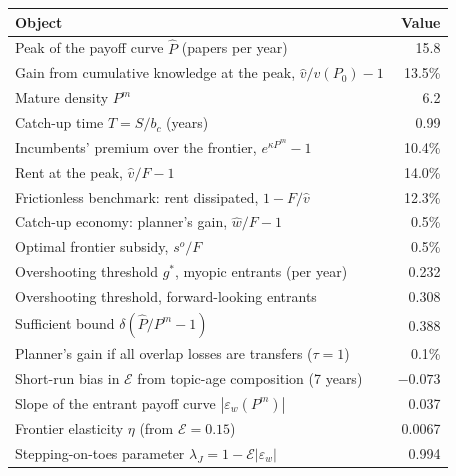 \begin{tabular}{@{}lr@{}}
\toprule
Object & Value \\
\midrule
Peak of the payoff curve $\hat P$ (papers per year) & 15.8 \\
Gain from cumulative knowledge at the peak, $\hat v/v(P_0)-1$ & 13.5\% \\
Mature density $P^m$ & 6.2 \\
Catch-up time $T=S/b_c$ (years) & 0.99 \\
Incumbents' premium over the frontier, $e^{\kappa P^m}-1$ & 10.4\% \\
Rent at the peak, $\hat v/F-1$ & 14.0\% \\
Frictionless benchmark: rent dissipated, $1-F/\hat v$ & 12.3\% \\
Catch-up economy: planner's gain, $\hat w/F-1$ & 0.5\% \\
Optimal frontier subsidy, $s^o/F$ & 0.5\% \\
Overshooting threshold $g^*$, myopic entrants (per year) & 0.232 \\
Overshooting threshold, forward-looking entrants & 0.308 \\
Sufficient bound $\delta(\hat P/P^m-1)$ & 0.388 \\
Planner's gain if all overlap losses are transfers ($\tau=1$) & 0.1\% \\
Short-run bias in $\mathcal{E}$ from topic-age composition (7 years) & $-0.073$ \\
Slope of the entrant payoff curve $|\varepsilon_w(P^m)|$ & 0.037 \\
Frontier elasticity $\eta$ (from $\mathcal{E}=0.15$) & 0.0067 \\
Stepping-on-toes parameter $\lambda_J=1-\mathcal{E}|\varepsilon_w|$ & 0.994 \\
\bottomrule
\end{tabular}
